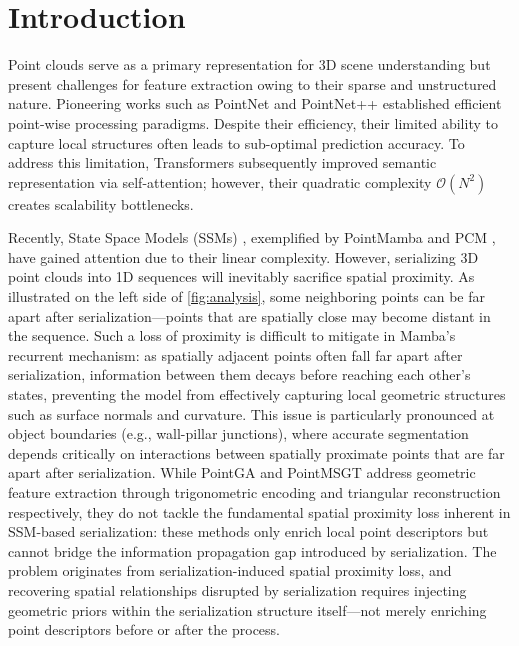 \documentclass[a4paper,fleqn]{cas-sc}
\begin{document}
\maketitle



\section{Introduction} \label{sec:intro}
Point clouds serve as a primary representation for 3D scene understanding but present challenges for feature extraction owing to their sparse and unstructured nature. Pioneering works such as PointNet and PointNet++ \cite{pointnet,PointNet++} established efficient point-wise processing paradigms. Despite their efficiency, their limited ability to capture local structures often leads to sub-optimal prediction accuracy. To address this limitation, Transformers \cite{attention,pt,ptv2,ptv3} subsequently improved semantic representation via self-attention; however, their quadratic complexity $\mathcal{O}(N^2)$ creates scalability bottlenecks.

Recently, State Space Models (SSMs) \cite{ssm,Mamba,VisionMamba}, exemplified by
PointMamba \cite{PointMamba} and PCM \cite{pcm}, have gained attention
due to their linear complexity. However, serializing 3D point clouds into
1D sequences will inevitably sacrifice spatial proximity. As illustrated on the left side of \cref{fig:analysis}, some neighboring points can be far apart
after serialization---points that are spatially close may become
distant in the sequence. Such a loss of
proximity is difficult to mitigate in Mamba's recurrent mechanism:
as spatially adjacent points often fall far apart after serialization,
information between them decays before reaching each other's states,
preventing the model from effectively capturing local geometric
structures such as surface normals and curvature. This issue is
particularly pronounced at object boundaries (e.g., wall-pillar
junctions), where accurate segmentation depends critically on
interactions between spatially proximate points that are far apart
after serialization. While PointGA \cite{pointga} and PointMSGT \cite{pointmsgt} address geometric feature extraction through trigonometric encoding and triangular reconstruction respectively, they do not tackle the fundamental spatial proximity loss inherent in SSM-based serialization: these methods only enrich local point descriptors but cannot bridge the information propagation gap introduced by serialization. The problem originates from serialization-induced spatial proximity loss, and recovering spatial relationships disrupted by serialization requires injecting geometric priors within the serialization structure itself—not merely enriching point descriptors before or after the process.
\end{document}
